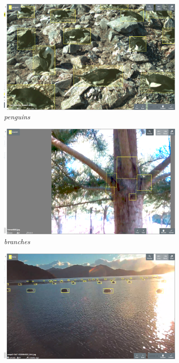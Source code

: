 \begin{figure}[h!]
\centering
\begin{subfigure}[t]{0.24\linewidth}
  \includegraphics[width=1.0\linewidth]{figures/annotation/screenshots/penguins2.png}
   \caption{\emph{penguins}}
\end{subfigure}%
\begin{subfigure}[t]{0.24\linewidth}
  \includegraphics[width=1.0\linewidth]{figures/annotation/screenshots/branches3.png}
   \caption{\emph{branches}}
\end{subfigure}%
\begin{subfigure}[t]{0.24\linewidth}
  \includegraphics[width=1.0\linewidth]{figures/annotation/screenshots/buoys.png}

\end{subfigure}
\end{figure}
